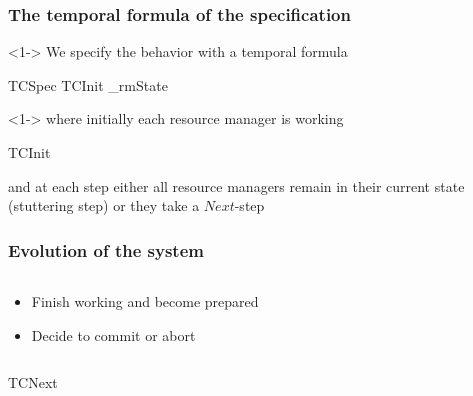 \begin{frame}
    \frametitle{The temporal formula of the specification}
    \begin{uncoverenv}<1->
            We specify the behavior with a temporal formula
        \begin{tlabox}
            TCSpec  TCInit \land \Box [TCNext]_{rmState}
        \end{tlabox}
    \end{uncoverenv}
    \begin{uncoverenv}<1->
        where initially each resource manager is working
        \begin{tlabox}
            TCInit 
        \end{tlabox}
        and at each step either all resource managers remain in their
        current state (stuttering step) or they take a $Next$-step
    \end{uncoverenv}
\end{frame}

\begin{frame}
    \frametitle{Evolution of the system}

    \begin{columns}[c]
    \begin{column}{0.65\textwidth}

        \begin{itemize}
            \item<2> Finish working and become prepared
            \item<3> Decide to commit or abort
        \end{itemize}
    \end{column}
    \begin{column}{0.35\textwidth}
        \centering
    \end{column}
    \end{columns}
    \vspace{\baselineskip}
    \begin{tlabox}
        TCNext  {}
         
    \end{tlabox}
\end{frame}

